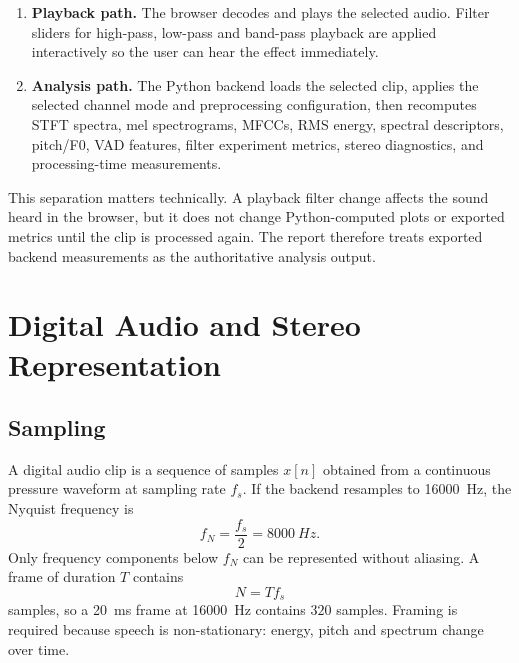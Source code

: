 ﻿\documentclass[11pt,a4paper]{article}
\begin{document}
\begin{enumerate}
    \item \textbf{Playback path.} The browser decodes and plays the selected audio. Filter sliders for high-pass, low-pass and band-pass playback are applied interactively so the user can hear the effect immediately.
    \item \textbf{Analysis path.} The Python backend loads the selected clip, applies the selected channel mode and preprocessing configuration, then recomputes STFT spectra, mel spectrograms, MFCCs, RMS energy, spectral descriptors, pitch/F0, VAD features, filter experiment metrics, stereo diagnostics, and processing-time measurements.
\end{enumerate}

This separation matters technically. A playback filter change affects the sound heard in the browser, but it does not change Python-computed plots or exported metrics until the clip is processed again. The report therefore treats exported backend measurements as the authoritative analysis output.

\section{Digital Audio and Stereo Representation}
\subsection{Sampling}
A digital audio clip is a sequence of samples $x[n]$ obtained from a continuous pressure waveform at sampling rate $f_s$. If the backend resamples to \SI{16000}{Hz}, the Nyquist frequency is
\begin{equation}
    f_N = \frac{f_s}{2} = \SI{8000}{Hz}.
\end{equation}
Only frequency components below $f_N$ can be represented without aliasing. A frame of duration $T$ contains
\begin{equation}
    N = T f_s
\end{equation}
samples, so a \SI{20}{ms} frame at \SI{16000}{Hz} contains $320$ samples. Framing is required because speech is non-stationary: energy, pitch and spectrum change over time.
\end{document}
